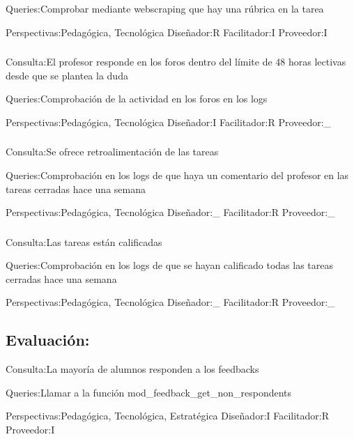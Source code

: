 Queries:Comprobar mediante webscraping que hay una rúbrica en la tarea

Perspectivas:Pedagógica, Tecnológica 
Diseñador:R Facilitador:I Proveedor:I
\subsubsection{}
Consulta:El profesor responde en los foros dentro del límite de 48 horas lectivas desde que se plantea la duda

Queries:Comprobación de la actividad en los foros en los logs

Perspectivas:Pedagógica, Tecnológica 
Diseñador:I Facilitador:R Proveedor:\_
\subsubsection{}
Consulta:Se ofrece retroalimentación de las tareas

Queries:Comprobación en los logs de que haya un comentario del profesor en las tareas cerradas hace una semana

Perspectivas:Pedagógica, Tecnológica 
Diseñador:\_ Facilitador:R Proveedor:\_
\subsubsection{}
Consulta:Las tareas están calificadas

Queries:Comprobación en los logs de que se hayan calificado todas las tareas cerradas hace una semana

Perspectivas:Pedagógica, Tecnológica 
Diseñador:\_ Facilitador:R Proveedor:\_

\subsection{Evaluación:}
Consulta:La mayoría de alumnos responden a los feedbacks

Queries:Llamar a la función mod\_feedback\_get\_non\_respondents

Perspectivas:Pedagógica, Tecnológica, Estratégica
Diseñador:I Facilitador:R Proveedor:I


